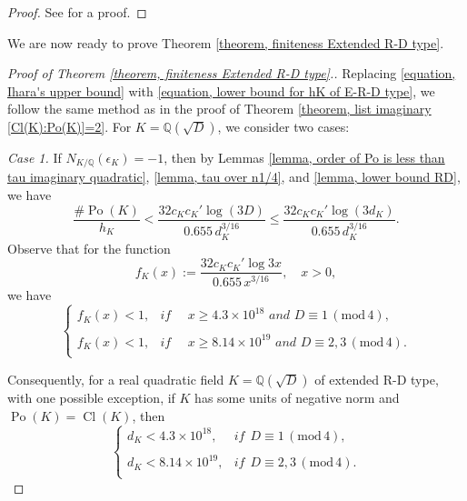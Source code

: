 \documentclass[12pt]{amsart}
\theoremstyle{definition}
\numberwithin{equation}{section}
\DeclareMathOperator{\Po}{Po}
\DeclareMathOperator{\Cl}{Cl}
\begin{document}
\begin{proof}
See \cite[p. 423]{MW} for a proof.
\end{proof}

We are now ready to prove Theorem \ref{theorem, finiteness Extended R-D type}.
\begin{proof}[Proof of Theorem \ref{theorem, finiteness Extended R-D type}.] Replacing \eqref{equation, Ihara's upper bound} with \eqref{equation, lower bound for hK of E-R-D type}, we follow the same method as in the proof of Theorem \ref{theorem, list imaginary [Cl(K):Po(K)]=2}. %
For $K=\mathbb{Q}(\sqrt{D})$, we  consider two cases:

\noindent
 \textit{Case 1.} 
		If $N_{K/\mathbb{Q}}(\epsilon_K)=-1$, then by Lemmas \ref{lemma, order of Po is less than tau imaginary quadratic}, \ref{lemma, tau over n1/4}, and \ref{lemma, lower bound RD}, we have
		\begin{equation} \label{equation, Po(K) over hK real E-R-D}
			\frac{\# \Po(K)}{h_K} < \frac{32 c_K c_K' \log (3D)}{0.655 \, d_K^{3/16}} \leq \frac{32 c_K c_K' \log (3d_K)}{0.655 \, d_K^{3/16}}. 
		\end{equation}
Observe that for the function
		\begin{equation*}
			f_{K}(x):=\frac{32 c_K c_K' \log 3x}{0.655 \, x^{3/16}}, \quad x>0,
		\end{equation*}
	we have
		\begin{equation*}
			\left\{
			\begin{array}{ll}
				f_K(x)<1, & \textit{if ~~ $x \geq 4.3 \times 10^{18}$ and  $D \equiv 1 \, (\mathrm{mod}\, 4)$},\\
				& \\
				f_K(x) <1,	 & \textit{if ~~ $x \geq 8.14 \times 10^{19}$ and   $D \equiv 2,3 \,  (\mathrm{mod}\, 4)$}.\\
			\end{array}
			\right.
		\end{equation*}
		
		Consequently, for a real quadratic field $K=\mathbb{Q}(\sqrt{D})$ of extended R-D type, with one possible exception,  if $K$ has some units of negative norm and $\Po(K)=\Cl(K)$, then
		\begin{equation}  \label{equation, upper bound for dK and f.u=-1}
			\left\{
			\begin{array}{ll}
				d_K < 4.3\times 10^{18}, & \textit{if} ~~ D \equiv 1 \, (\mathrm{mod}\, 4),\\
				& \\
				d_K < 8.14 \times 10^{19},  & \textit{if} ~~ D \equiv 2,3 \, (\mathrm{mod}\, 4).\\
			\end{array}
			\right.
		\end{equation}


\end{proof}
\end{document}
